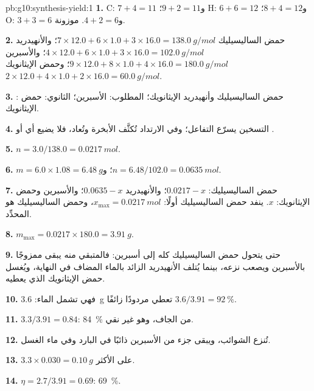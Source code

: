 \begin{solution}{pb:g10:synthesis-yield:1}
\textbf{1.} C: $7 + 4 = 11$ و$9 + 2 = 11$؛ H: $6 + 6 = 12$
و$8 + 4 = 12$؛ O: $3 + 3 = 6$ و$4 + 2 = 6$. موزونة.

\textbf{2.} حمض الساليسيليك $7 \times 12.0 + 6 \times 1.0 + 3 \times 16.0
= \qty{138.0}{g/mol}$؛ والأنهيدريد $4 \times 12.0 + 6 \times 1.0 +
3 \times 16.0 = \qty{102.0}{g/mol}$؛ والأسبرين $9 \times 12.0 + 8 \times
1.0 + 4 \times 16.0 = \qty{180.0}{g/mol}$؛ وحمض الإيثانويك $2 \times 12.0
+ 4 \times 1.0 + 2 \times 16.0 = \qty{60.0}{g/mol}$.

\textbf{3.} : حمض الساليسيليك وأنهيدريد الإيثانويك؛ 
المطلوب: الأسبرين؛  الثانوي: حمض الإيثانويك.

\textbf{4.} التسخين يسرّع التفاعل؛ وفي الارتداد تُكثَّف الأبخرة وتُعاد، فلا
يضيع أي  أو .

\textbf{5.} $n = 3.0 / 138.0 = \qty{0.0217}{mol}$.

\textbf{6.} $m = 6.0 \times 1.08 = \qty{6.48}{g}$؛
و$n = 6.48 / 102.0 = \qty{0.0635}{mol}$.

\textbf{7.} حمض الساليسيليك: $0.0217 - x$؛ والأنهيدريد $0.0635 - x$؛
والأسبرين وحمض الإيثانويك: $x$. ينفد حمض الساليسيليك أولًا:
$x_{\max} = \qty{0.0217}{mol}$، وحمض الساليسيليك هو المحدِّد.

\textbf{8.} $m_{\max} = 0.0217 \times 180.0 = \qty{3.91}{g}$.

\textbf{9.} حتى يتحول حمض الساليسيليك كله إلى أسبرين: فالمتبقي منه يبقى ممزوجًا
بالأسبرين ويصعب نزعه، بينما يُتلف الأنهيدريد الزائد بالماء المضاف في النهاية،
ويُغسل حمض الإيثانويك الذي يعطيه.

\textbf{10.} فهي تشمل الماء: \qty{3.6}{g} تعطي مردودًا زائفًا
$3.6 / 3.91 = \qty{92}{\percent}$.

\textbf{11.} $3.3 / 3.91 = 0.84$: \qty{84}{\percent} من  الجاف،
وهو غير نقي.

\textbf{12.} تُنزع الشوائب، ويبقى جزء من الأسبرين ذائبًا في  البارد وفي ماء
الغسل.

\textbf{13.} $3.3 \times 0.030 = \qty{0.10}{g}$ على الأكثر.

\textbf{14.} $\eta = 2.7 / 3.91 = 0.69$: \qty{69}{\percent}.


\end{solution}

